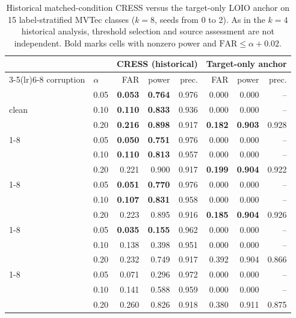 \begin{table}[pos=t]
\centering
\caption{Historical matched-condition CRESS versus the target-only LOIO anchor on 15 label-stratified MVTec classes ($k{=}8$, seeds from 0 to 2). As in the $k{=}4$ historical analysis, threshold selection and source assessment are not independent. Bold marks cells with nonzero power and $\mathrm{FAR}\le\alpha{+}0.02$.}
\label{tab:sc3r-k8}
\footnotesize
\setlength{\tabcolsep}{3pt}
\begin{tabular}{llrrrrrr}
\toprule
 & & \multicolumn{3}{c}{CRESS (historical)} & \multicolumn{3}{c}{Target-only anchor} \\
\cmidrule(lr){3-5}\cmidrule(lr){6-8}
corruption & $\alpha$ & FAR & power & prec. & FAR & power & prec. \\
\midrule
\multirow{3}{*}{clean} & 0.05 & \textbf{0.053} & \textbf{0.764} & 0.976 & 0.000 & 0.000 & -- \\
 & 0.10 & \textbf{0.110} & \textbf{0.833} & 0.936 & 0.000 & 0.000 & -- \\
 & 0.20 & \textbf{0.216} & \textbf{0.898} & 0.917 & \textbf{0.182} & \textbf{0.903} & 0.928 \\
\cmidrule(lr){1-8}
\multirow{3}{*}{blur} & 0.05 & \textbf{0.050} & \textbf{0.751} & 0.976 & 0.000 & 0.000 & -- \\
 & 0.10 & \textbf{0.110} & \textbf{0.813} & 0.957 & 0.000 & 0.000 & -- \\
 & 0.20 & 0.221 & 0.900 & 0.917 & \textbf{0.199} & \textbf{0.904} & 0.922 \\
\cmidrule(lr){1-8}
\multirow{3}{*}{bright/contr.} & 0.05 & \textbf{0.051} & \textbf{0.770} & 0.976 & 0.000 & 0.000 & -- \\
 & 0.10 & \textbf{0.107} & \textbf{0.831} & 0.958 & 0.000 & 0.000 & -- \\
 & 0.20 & 0.223 & 0.895 & 0.916 & \textbf{0.185} & \textbf{0.904} & 0.926 \\
\cmidrule(lr){1-8}
\multirow{3}{*}{Gaussian noise} & 0.05 & \textbf{0.035} & \textbf{0.155} & 0.962 & 0.000 & 0.000 & -- \\
 & 0.10 & 0.138 & 0.398 & 0.951 & 0.000 & 0.000 & -- \\
 & 0.20 & 0.232 & 0.749 & 0.917 & 0.392 & 0.904 & 0.866 \\
\cmidrule(lr){1-8}
\multirow{3}{*}{JPEG} & 0.05 & 0.071 & 0.296 & 0.972 & 0.000 & 0.000 & -- \\
 & 0.10 & 0.141 & 0.588 & 0.959 & 0.000 & 0.000 & -- \\
 & 0.20 & 0.260 & 0.826 & 0.918 & 0.380 & 0.911 & 0.875 \\
\bottomrule
\end{tabular}
\end{table}

